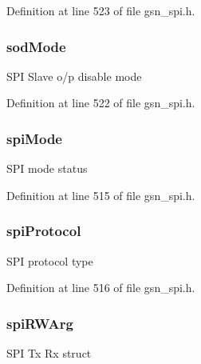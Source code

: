Definition at line 523 of file gsn\_\-spi.h.

\hypertarget{a00231_a6988180f451df73a4220e1f4df6c37d9}{
\subsubsection[{sodMode}]{ {\bf sodMode}}}
\label{a00231_a6988180f451df73a4220e1f4df6c37d9}
SPI Slave o/p disable mode 

Definition at line 522 of file gsn\_\-spi.h.

\hypertarget{a00231_ab1f5bd9a03dacfe8a653d9cc61bcf820}{
\subsubsection[{spiMode}]{ {\bf spiMode}}}
\label{a00231_ab1f5bd9a03dacfe8a653d9cc61bcf820}
SPI mode status 

Definition at line 515 of file gsn\_\-spi.h.

\hypertarget{a00231_a2cc829f36d85f4ba9500b54e9a74b0d3}{
\subsubsection[{spiProtocol}]{ {\bf spiProtocol}}}
\label{a00231_a2cc829f36d85f4ba9500b54e9a74b0d3}
SPI protocol type 

Definition at line 516 of file gsn\_\-spi.h.

\hypertarget{a00231_acb4512599754c80bddd73e9a02574f9e}{
\subsubsection[{spiRWArg}]{ {\bf spiRWArg}}}
\label{a00231_acb4512599754c80bddd73e9a02574f9e}
SPI Tx Rx struct 

